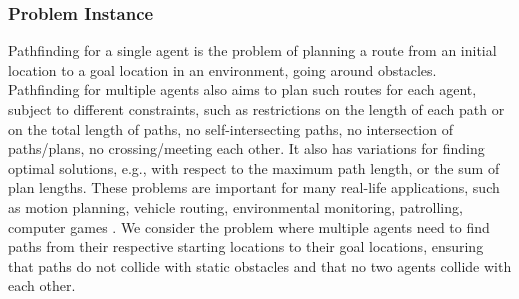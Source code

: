 \documentclass[a4paper, titlepage]{article}
\begin{document}
\subsubsection{Problem Instance}
Pathfinding for a single agent is the problem of planning a 
route from an initial
location to a goal location in an environment, going around 
obstacles. 
Pathfinding for multiple agents also aims to plan such 
routes for each agent, 
subject to different constraints, such as restrictions on 
the length of each path 
or on the total length of paths, no self-intersecting 
paths, no intersection of 
paths/plans, no crossing/meeting each other.  It also has 
variations for finding optimal solutions, e.g., with 
respect 
to the maximum path length, or the sum of plan lengths. 
These problems are important
for many real-life applications, such as motion planning, 
vehicle routing, environmental monitoring, patrolling, 
computer games \cite{ekos2013}. We consider the 
problem 
where multiple agents need to find paths 
from their respective starting locations to their goal 
locations, ensuring that 
paths do not collide with static obstacles and that no two 
agents collide with 
each other. 
\end{document}
